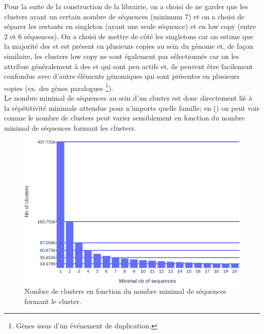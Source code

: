 \documentclass[10pt]{article}
\begin{document}
\bigskip

Pour la suite de la construction de la librairie, on a choisi de ne garder que les clusters ayant un certain nombre de séquences (minimum 7) et on a choisi de séparer les restants en \og singleton \fg{}  (ayant une seule séquence) et en \og low copy \fg{} (entre 2 et 6 séquences). On a choisi de mettre de côté les \og singletons \fg{} car on estime que la majorité des \acrshort{et} est présent en plusieurs copies au sein du génome et, de façon similaire, les clusters \og low copy \fg{} ne sont également pas sélectionnés car on les attribue généralement à des \acrshort{et} qui sont peu actifs et, ils peuvent être facilement confondus avec d'autre éléments génomiques qui sont présentes en plusieurs copies (ex. des gènes paralogues \footnote{Gènes issus d'un événement de duplication.}). \\
Le nombre minimal de séquences au sein d'un cluster est donc directement lié à la répétitivité minimale attendue pour n'importe quelle famille; en \figureautorefname{ \ref{fig:nb_clst}} (\linkautorefname{\ref{link10}}) on peut voir comme le nombre de clusters peut varier sensiblement en fonction du nombre minimal de séquences formant les clusters. \\

\bigskip

\begin{figure}[H]
    \centering
    \includegraphics[width=\textwidth]{img/plots/nb_clust_by_min.eps}
    \caption{Nombre de clusters en fonction du nombre minimal de séquences formant le cluster.}
    \label{fig:nb_clst}
\end{figure}

\bigskip
\end{document}
